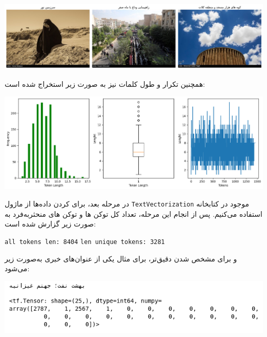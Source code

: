 \begin{qsolve}
	\begin{center}
		\includegraphics*[width=1\linewidth]{pics/img22.png}
		\label{تصاویری از دیتاست}
	\end{center}
	
	همچنین تکرار و طول کلمات نیز به صورت زیر استخراج شده است:
	
	\begin{center}
		\includegraphics*[width=0.8\linewidth]{pics/img23.png}
		\label{طول و تکرار کلمات در دیتاست}
	\end{center}
	
	در مرحله بعد، برای  کردن داده‌ها از ماژول \texttt{TextVectorization} موجود در کتابخانه  استفاده می‌کنیم. پس از انجام این مرحله، تعداد کل توکن ها و توکن های منحثر‌به‌فرد به صورت زیر گزارش شده است:
	
	\begin{latin}
		\texttt{all tokens len: 8404}
		\texttt{len unique tokens: 3281}
	\end{latin}
	
	
	و برای مشخص شدن دقیق‌تر، برای مثال یکی از عنوان‌های خبری به‌صورت زیر  می‌شود:
	
	\begin{center}
		\includegraphics*[width=0.8\linewidth]{pics/img24.png}
		\label{عنوان tokenize شده}
	\end{center}
	

\end{qsolve}
